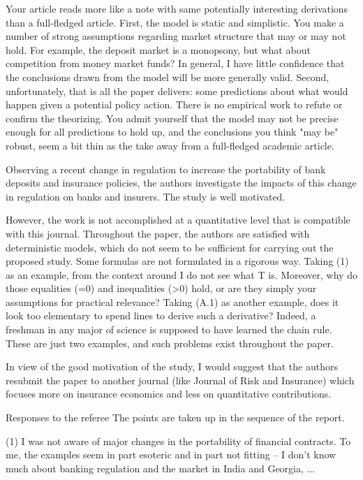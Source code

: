 Your article reads more like a note with same potentially interesting derivations than a full-fledged article.  First, the model is static and simplistic.  You make a number of strong assumptions regarding market structure that may or may not hold. For example, the deposit market is a monopsony, but what about competition from money market funds?  In general, I have little confidence that the conclusions drawn from the model will be more generally valid. Second, unfortunately, that is all the paper delivers: some predictions about what would happen given a potential policy action. There is no empirical work to refute or confirm the theorizing. You admit yourself that the model may not be precise enough for all predictions to hold up, and the conclusions you think "may be" robust, seem a bit thin as the take away from a full-fledged academic article.


Observing a recent change in regulation to increase the portability of bank deposits and insurance policies, the authors investigate the impacts of this change in regulation on banks and insurers. The study is well motivated.

However, the work is not accomplished at a quantitative level that is compatible with this journal. Throughout the paper, the authors are satisfied with deterministic models, which do not seem to be sufficient for carrying out the proposed study. Some formulas are not formulated in a rigorous way. Taking (1) as an example, from the context around I do not see what T is. Moreover, why do those equalities (=0) and inequalities (>0) hold, or are they simply your assumptions for practical relevance? Taking (A.1) as another example, does it look too elementary to spend lines to derive such a derivative? Indeed, a freshman in any major of science is supposed to have learned the chain rule. These are just two examples, and such problems exist throughout the paper.

In view of the good motivation of the study, I would suggest that the authors resubmit the paper to another journal (like Journal of Risk and Insurance) which focuses more on insurance economics and less on quantitative contributions.
 




Responses to the referee
The points are taken up in the sequence of the report.

(1) I was not aware of major changes in the portability of financial contracts. To me, the examples seem in part esoteric and in part not fitting -- I don't know much about banking regulation and the market in India and Georgia, ...

